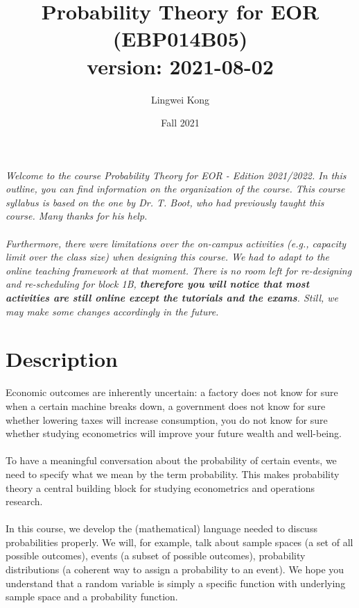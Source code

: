 \documentclass[openany]{article}
\title{Probability Theory for EOR (EBP014B05)\\
version: 2021-08-02}
\date{ Fall 2021}
\author{Lingwei Kong}
\begin{document}
\maketitle\thispagestyle{empty}
\textit{Welcome to the course Probability Theory for EOR - Edition 2021/2022. In
	this outline, you can find information on the organization of the course. This course syllabus is based on the one by Dr. T. Boot, who had previously taught this course. Many thanks for his help.\\~\\
	 Furthermore, there were limitations over the on-campus activities (e.g., capacity limit over the class size) when designing this course. We had to adapt to the online teaching framework at that moment. There is no room left for re-designing and re-scheduling for block 1B, \textbf{therefore you will notice that most activities are still online except the tutorials and the exams}. Still, we may make some changes accordingly in the future.} 
 \tableofcontents
 
 
 \newpage
\section{Description}
Economic outcomes are inherently uncertain: a factory does not know for
sure when a certain machine breaks down, a government does not know
for sure whether lowering taxes will increase consumption, you do not know
for sure whether studying econometrics will improve your future wealth and
well-being.\\~\\
To have a meaningful conversation about the probability of
certain events, we need to specify what we mean by the term probability. This makes probability theory a central building block for studying econometrics and operations research.\\~\\
In this course, we develop the (mathematical) language needed to discuss probabilities properly. We will, for example, talk about sample spaces (a set
of all possible outcomes), events (a subset of possible outcomes), probability distributions (a coherent way to assign a probability to an event). We hope you understand that a random variable is simply a specific function with underlying sample space and a probability function. 
\end{document}

